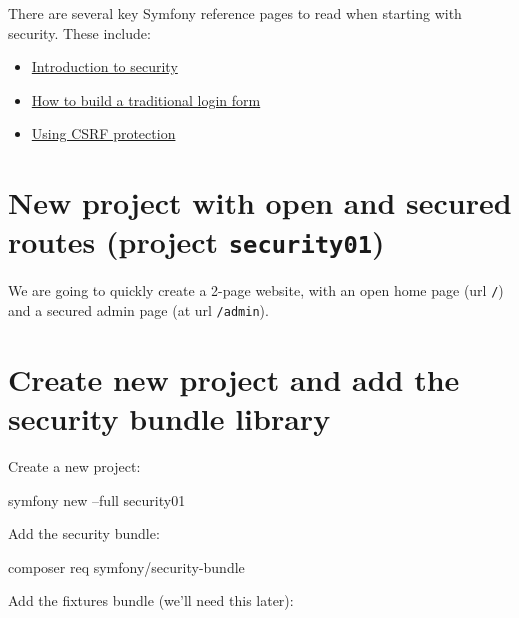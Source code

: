 \documentclass[a4paperpaper,openright]{book}
\newenvironment{Shaded}{}{}
\newcommand{\ExtensionTok}[1]{#1}
\newcommand{\NormalTok}[1]{#1}
\begin{document}
There are several key Symfony reference pages to read when starting with
security. These include:

\begin{itemize}
\item
  \href{https://symfony.com/doc/current/security.html}{Introduction to
  security}
\item
  \href{https://symfony.com/doc/current/security/form_login_setup.html}{How
  to build a traditional login form}
\item
  \href{https://symfony.com/doc/current/security/csrf.html}{Using CSRF
  protection}
\end{itemize}

\hypertarget{new-project-with-open-and-secured-routes-project-security01}{%
\section{\texorpdfstring{New project with open and secured routes
(project
\texttt{security01})}{New project with open and secured routes (project security01)}}\label{new-project-with-open-and-secured-routes-project-security01}}

We are going to quickly create a 2-page website, with an open home page
(url \texttt{/}) and a secured admin page (at url \texttt{/admin}).

\hypertarget{create-new-project-and-add-the-security-bundle-library}{%
\section{Create new project and add the security bundle
library}\label{create-new-project-and-add-the-security-bundle-library}}

Create a new project:

\begin{Shaded}
\begin{Highlighting}[]
    \ExtensionTok{symfony}\NormalTok{ new --full security01}
\end{Highlighting}
\end{Shaded}

Add the security bundle:

\begin{Shaded}
\begin{Highlighting}[]
    \ExtensionTok{composer}\NormalTok{ req symfony/security-bundle}
\end{Highlighting}
\end{Shaded}

Add the fixtures bundle (we'll need this later):
\end{document}

